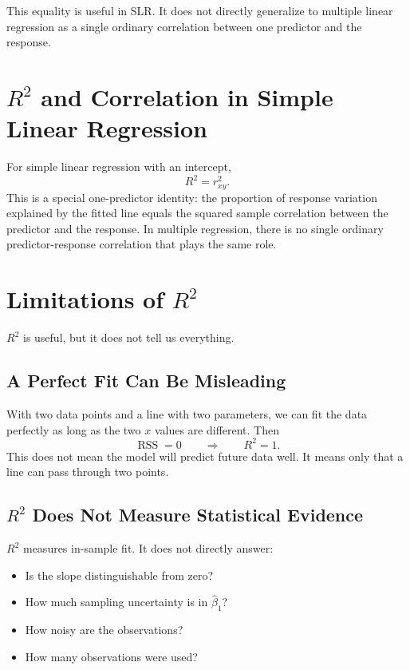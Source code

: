 {This equality is useful in SLR.  It does not directly generalize to multiple linear regression as a single ordinary correlation between one predictor and the response.
}{
\section{\texorpdfstring{$R^2$}{R-squared} and Correlation in Simple Linear Regression}

For simple linear regression with an intercept,
\begin{equation}
  R^2=r_{xy}^2.
\end{equation}
This is a special one-predictor identity: the proportion of response variation explained by the fitted line equals the squared sample correlation between the predictor and the response.  In multiple regression, there is no single ordinary predictor-response correlation that plays the same role.
}
\section{Limitations of \texorpdfstring{$R^2$}{R-squared}}

$R^2$ is useful, but it does not tell us everything.

\subsection{A Perfect Fit Can Be Misleading}

With two data points and a line with two parameters, we can fit the data perfectly as long as the two $x$ values are different.  Then
\begin{equation}
  \operatorname{RSS}=0
  \qquad\Rightarrow\qquad
  R^2=1.
\end{equation}
This does not mean the model will predict future data well.  It means only that a line can pass through two points.

\subsection{\texorpdfstring{$R^2$}{R-squared} Does Not Measure Statistical Evidence}

$R^2$ measures in-sample fit.  It does not directly answer:
\begin{itemize}
  \item Is the slope distinguishable from zero?
  \item How much sampling uncertainty is in $\widehat{\beta}_1$?
  \item How noisy are the observations?
  \item How many observations were used?
\end{itemize}

